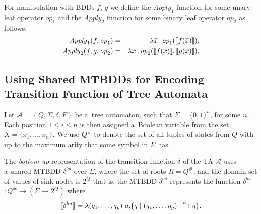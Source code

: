 For manipulation with BDDs $f$, $g$ we define the $\mathit{Apply}_1$ function
for some unary leaf operator $\mathit{op}_1$ and the $\mathit{Apply}_2$ function for some
binary leaf operator $\mathit{op}_2$ as follows: 
\begin{eqnarray}
\mathit{Apply}_1(f,\mathit{op}_1) & = & \lambda
\overline{x}\,.\,\mathit{op}_1(\text{\textlbrackdbl}f(\overline{x})\text{\textrbrackdbl}),\\
\mathit{Apply}_2(f, g, \mathit{op}_2) & = & \lambda
\overline{x}\,.\,\mathit{op}_2(\text{\textlbrackdbl}f(\overline{x})\text{\textrbrackdbl}, \text{\textlbrackdbl}g(\overline{x})\text{\textrbrackdbl}).
\end{eqnarray}

\newpage
\subsection[Usage
of MTBDDs with TA]{Using Shared MTBDDs for Encoding Transition Function of Tree Automata} Let $\mathcal{A} = (Q, \Sigma, \delta, F)$
be a~tree automaton, such that $\Sigma = \{0, 1\}^n$, for some $n$. Each
position $1 \leq i \leq n$ is then assigned a~Boolean variable from the set $X =
\{x_1,\ldots,x_n\}$. We use $Q^\#$ to denote the set of all tuples of states from $Q$ with up to the
maximum arity that some symbol in $\Sigma$ has.

The \emph{bottom-up} representation of the transition function $\delta$ of the
TA $\mathcal{A}$ uses a~shared MTBDD $\delta^{bu}$ over $\Sigma$, where the set
of roots $R = Q^\#$, and the domain set of values of sink nodes is $2^Q$ that
is, the MTBDD $\delta^{bu}$ represents the function \textlbrackdbl $\delta^{bu}$
\textrbrackdbl $: Q^\# \rightarrow (\Sigma \rightarrow 2^Q)$ where
 \begin{equation}
  \text{\textlbrackdbl} \delta^{bu} \text{\textrbrackdbl} =
 \lambda (q_1,\ldots,q_p)\ a . \{q \mid (q_1,\ldots,q_p)
 \overset{a}{\longrightarrow} q\}. \end{equation}

